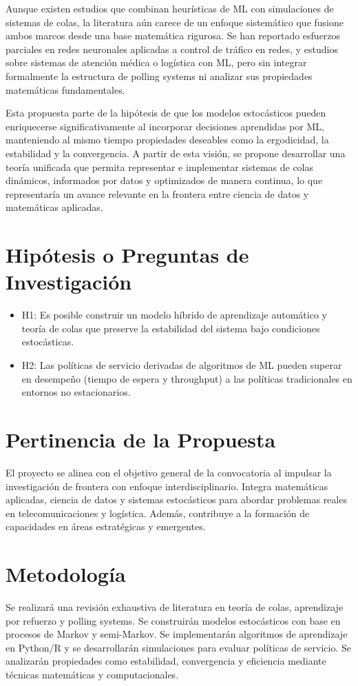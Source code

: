 \documentclass[12pt]{article}
\begin{document}
Aunque existen estudios que combinan heurísticas de ML con simulaciones de sistemas de colas, la literatura aún carece de un enfoque sistemático que fusione ambos marcos desde una base matemática rigurosa. Se han reportado esfuerzos parciales en redes neuronales aplicadas a control de tráfico en redes, y estudios sobre sistemas de atención médica o logística con ML, pero sin integrar formalmente la estructura de polling systems ni analizar sus propiedades matemáticas fundamentales. 

Esta propuesta parte de la hipótesis de que los modelos estocásticos pueden enriquecerse significativamente al incorporar decisiones aprendidas por ML, manteniendo al mismo tiempo propiedades deseables como la ergodicidad, la estabilidad y la convergencia. A partir de esta visión, se propone desarrollar una teoría unificada que permita representar e implementar sistemas de colas dinámicos, informados por datos y optimizados de manera continua, lo que representaría un avance relevante en la frontera entre ciencia de datos y matemáticas aplicadas.

\section{Hipótesis o Preguntas de Investigación}
\begin{itemize}
  \item H1: Es posible construir un modelo híbrido de aprendizaje automático y teoría de colas que preserve la estabilidad del sistema bajo condiciones estocásticas.
  \item H2: Las políticas de servicio derivadas de algoritmos de ML pueden superar en desempeño (tiempo de espera y throughput) a las políticas tradicionales en entornos no estacionarios.
\end{itemize}

\section{Pertinencia de la Propuesta}
El proyecto se alinea con el objetivo general de la convocatoria al impulsar la investigación de frontera con enfoque interdisciplinario. Integra matemáticas aplicadas, ciencia de datos y sistemas estocásticos para abordar problemas reales en telecomunicaciones y logística. Además, contribuye a la formación de capacidades en áreas estratégicas y emergentes.

\section{Metodología}
Se realizará una revisión exhaustiva de literatura en teoría de colas, aprendizaje por refuerzo y polling systems. Se construirán modelos estocásticos con base en procesos de Markov y semi-Markov. Se implementarán algoritmos de aprendizaje en Python/R y se desarrollarán simulaciones para evaluar políticas de servicio. Se analizarán propiedades como estabilidad, convergencia y eficiencia mediante técnicas matemáticas y computacionales.
\end{document}

